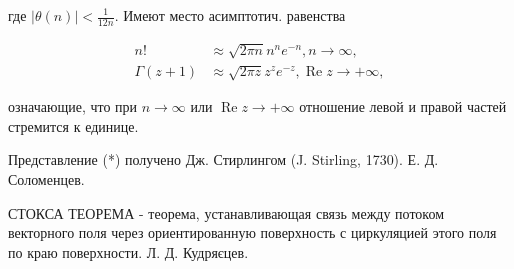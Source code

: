 \documentclass[10pt]{article}
\begin{document}
где $|\theta(n)|<\frac{1}{12 n}$. Имеют место асимптотич. равенства



\[

\begin{aligned}

n ! & \approx \sqrt{2 \pi n} n^{n} e^{-n}, n \rightarrow \infty, \\

\Gamma(z+1) & \approx \sqrt{2 \pi z} z^{z} e^{-z}, \operatorname{Re} z \longrightarrow+\infty,

\end{aligned}

\]



означающие, что при $n \rightarrow \infty$ или $\operatorname{Re} z \rightarrow+\infty$ отношение левой и правой частей стремится к единице.



Представление (*) получено Дж. Стирлингом (J. Stirling, 1730). Е. Д. Соломенцев.



СТОКСА ТЕОРЕМА - теорема, устанавливающая связь между потоком векторного поля через ориентированную поверхность с циркуляцией этого поля по краю поверхности. Л. Д. Кудряєцев.
\end{document}
